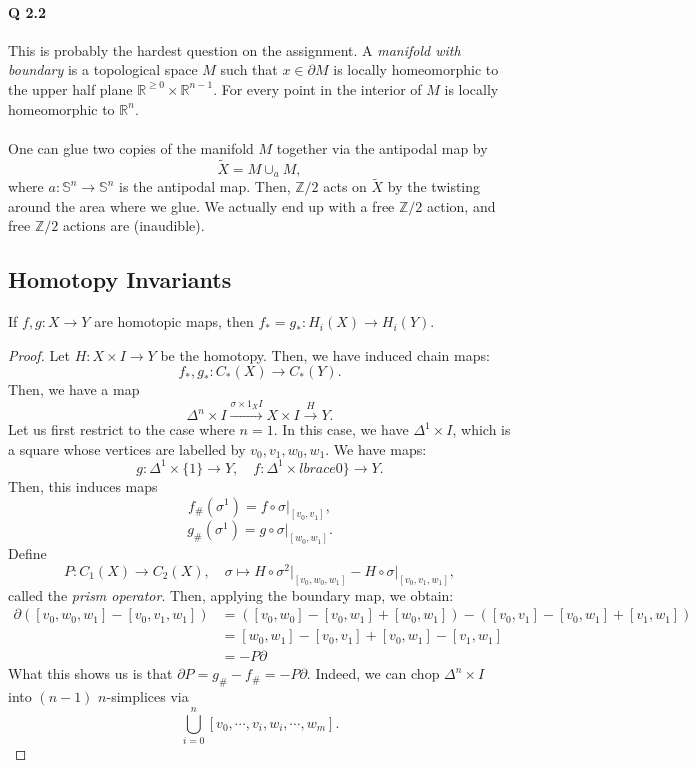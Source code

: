 \documentclass[a4paper]{report}
\theoremstyle{definition}
\theoremstyle{remark}
\theoremstyle{proposition}
\theoremstyle{conjecture}
\theoremstyle{lemma}
\theoremstyle{corollary}
\theoremstyle{exercise}
\begin{document}
\paragraph{Q 2.2} This is probably the hardest question on the assignment. A \emph{manifold with boundary} 
is a topological space $M$ such that $x\in \partial M$ is locally homeomorphic to the upper half plane 
$\mathbb{R}^{\geq 0} \times \mathbb{R}^{n-1}$. For every point in the interior of $M$ is locally homeomorphic 
to $\mathbb{R}^n$.\\\\ 
One can glue two copies of the manifold $M$ together via the antipodal map by 
$$\widetilde{X} = M \cup_a M,$$ where $a : \mathbb{S}^n \to \mathbb{S}^n$ is the antipodal map.
Then, $\mathbb{Z}/2$ acts on $\widetilde{X}$ by the twisting around the area where we glue.
We actually end up with a free $\mathbb{Z}/2$ action, and free $\mathbb{Z}/2$ actions are (inaudible).

\subsection{Homotopy Invariants}

\begin{theorem}
    If $f,g : X \to Y$ are homotopic maps, then $f_\ast = g_\ast : H_i(X) \to H_i(Y)$.
\end{theorem}

\begin{proof}
    Let $H : X \times I \to Y$ be the homotopy. Then, we have induced chain maps:
    $$f_\ast, g_\ast : C_\ast(X) \longrightarrow C_\ast(Y).$$
    Then, we have a map 
    $$\Delta^n \times I \stackrel{\sigma \times 1_XI}{\longrightarrow} X \times I \stackrel{H}{\longrightarrow} Y.$$
    Let us first restrict to the case where $n = 1$.
    In this case, we have $\Delta^1 \times I$, which is a square 
    whose vertices are labelled by $v_0,v_1,w_0,w_1$. We have maps:
    $$g : \Delta^1 \times \lbrace 1\rbrace \longrightarrow Y, \quad f : \Delta^1 \times lbrace 0 \rbrace \longrightarrow Y.$$
    Then, this induces maps 
    $$f_\#(\sigma^1) = f\circ \sigma\vert_{[v_0,v_1]},$$
    $$g_\#(\sigma^1) = g\circ \sigma\vert_{[w_0,w_1]}.$$
    Define $$P : C_1(X) \longrightarrow C_2(X), \quad \sigma \longmapsto H\circ \sigma^2\vert_{[v_0,w_0,w_1]} - H\circ \sigma\vert_{[v_0,v_1,w_1]},$$
    called the \emph{prism operator}.
    Then, applying the boundary map, we obtain:
    \begin{align*}
        \partial ([v_0,w_0,w_1] - [v_0,v_1,w_1]) &= ([v_0,w_0] - [v_0,w_1] + [w_0,w_1]) - ([v_0,v_1] - [v_0, w_1] + [v_1,w_1])\\ 
        &= [w_0, w_1] - [v_0,v_1] + [v_0,w_1] - [v_1,w_1]\\ 
        &= -P \partial
    \end{align*}
    What this shows us is that $\partial P = g_\# - f_\# = - P\partial$.
    Indeed, we can chop $\Delta^n \times I$ into $(n-1)$ $n$-simplices via 
    $$\bigcup_{i=0}^n [v_0,\cdots, v_i,w_i, \cdots, w_m].$$
\end{proof}
\end{document}
